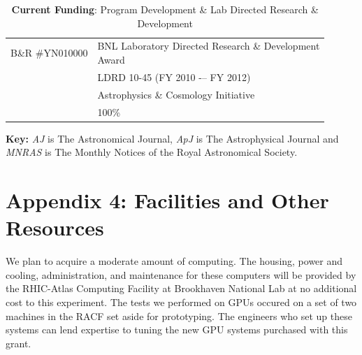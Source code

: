 \documentclass[12pt]{article}
\begin{document}
\begin{table}[h]
\begin{center}
\begin{tabular*}{0.85\textwidth}{ll}
B\&R \#YN010000  & \parbox[t]{\textwidth}{BNL Laboratory Directed 
   Research \& Development \\ Award} \\
                 & LDRD 10-45 (FY 2010 -– FY 2012) \\
                 & Astrophysics \& Cosmology Initiative \\
                 & 100\%
\end{tabular*}
\parbox{0.85\textwidth}{\caption{{\bf Current Funding}: Program Development 
\& Lab Directed Research \& Development \label{table:support}}}
\end{center}
\end{table}



\newpage
{}
\renewcommand{\refname}{\section*{Appendix 3: Bibliography for Narrative}\label{app:bib}}


\vspace{5mm}
\noindent
{\bf Key:} {\it AJ} is The Astronomical Journal, {\it ApJ} is The 
Astrophysical Journal and {\it MNRAS} is The Monthly Notices of the Royal
Astronomical Society.






\newpage
{}
\section*{Appendix 4: Facilities and Other Resources}

We plan to acquire a moderate amount of computing.  The housing, power and
cooling, administration, and maintenance for these computers will be provided
by the RHIC-Atlas Computing Facility at Brookhaven National Lab at no
additional cost to this experiment.	The tests we performed on GPUs occured
on a set of two machines in the RACF set aside for prototyping.  The engineers
who set up these systems can lend expertise to tuning the new GPU systems
purchased with this grant.

\newpage
{}
\end{document}
